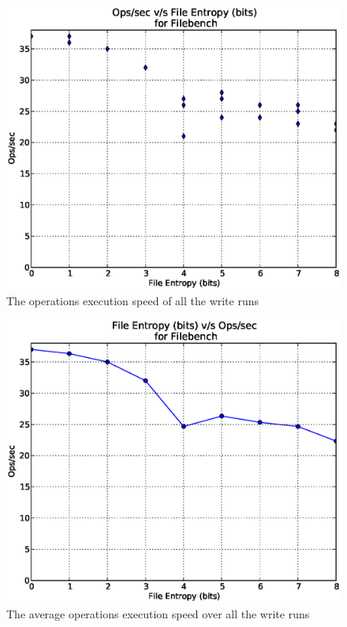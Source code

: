 \begin{figure}
\label{fig:wops}
\begin{center}
\includegraphics[scale=.55]{../results/write_ops_all.eps}
\caption{The operations execution speed of all the write runs}
\end{center}
\end{figure}


\begin{figure}
\label{fig:wopsavg}
\begin{center}
\includegraphics[scale=.55]{../results/write_ops_avg.eps}
\caption{The average operations execution speed over all the write runs}
\end{center}
\end{figure}

